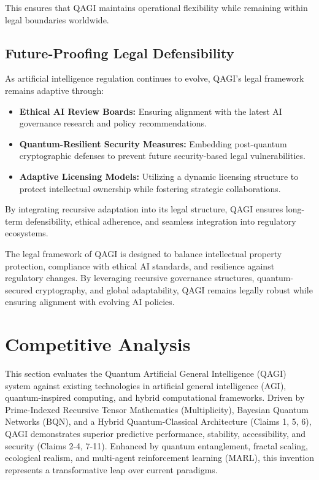 \documentclass{article}
\theoremstyle{plain}
\theoremstyle{claimstyle}
\begin{document}
This ensures that QAGI maintains operational flexibility while remaining within legal boundaries worldwide.

\subsection{Future-Proofing Legal Defensibility}

As artificial intelligence regulation continues to evolve, QAGI’s legal framework remains adaptive through:
\begin{itemize}
    \item \textbf{Ethical AI Review Boards:} Ensuring alignment with the latest AI governance research and policy recommendations.
    \item \textbf{Quantum-Resilient Security Measures:} Embedding post-quantum cryptographic defenses to prevent future security-based legal vulnerabilities.
    \item \textbf{Adaptive Licensing Models:} Utilizing a dynamic licensing structure to protect intellectual ownership while fostering strategic collaborations.
\end{itemize}

By integrating recursive adaptation into its legal structure, QAGI ensures long-term defensibility, ethical adherence, and seamless integration into regulatory ecosystems.

The legal framework of QAGI is designed to balance intellectual property protection, compliance with ethical AI standards, and resilience against regulatory changes. By leveraging recursive governance structures, quantum-secured cryptography, and global adaptability, QAGI remains legally robust while ensuring alignment with evolving AI policies.




\section{Competitive Analysis}

This section evaluates the Quantum Artificial General Intelligence (QAGI) system against existing technologies in artificial general intelligence (AGI), quantum-inspired computing, and hybrid computational frameworks. Driven by Prime-Indexed Recursive Tensor Mathematics (Multiplicity), Bayesian Quantum Networks (BQN), and a Hybrid Quantum-Classical Architecture (Claims 1, 5, 6), QAGI demonstrates superior predictive performance, stability, accessibility, and security (Claims 2-4, 7-11). Enhanced by quantum entanglement, fractal scaling, ecological realism, and multi-agent reinforcement learning (MARL), this invention represents a transformative leap over current paradigms.
\end{document}
